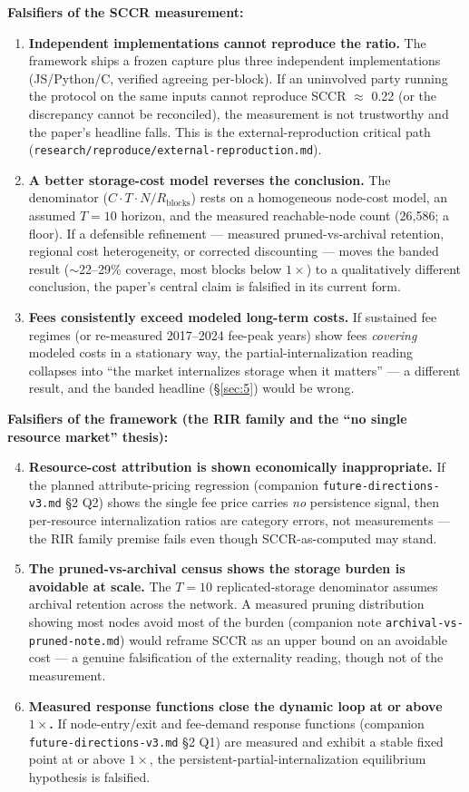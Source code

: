 \documentclass[11pt]{article}
\begin{document}
\textbf{Falsifiers of the SCCR measurement:}
\begin{enumerate}[nosep]
  \item \textbf{Independent implementations cannot reproduce the ratio.} The framework ships a frozen capture plus three independent implementations (JS/Python/C, verified agreeing per-block). If an uninvolved party running the protocol on the same inputs cannot reproduce SCCR $\approx$ 0.22 (or the discrepancy cannot be reconciled), the measurement is not trustworthy and the paper's headline falls. This is the external-reproduction critical path (\texttt{research/reproduce/external-reproduction.md}).
  \item \textbf{A better storage-cost model reverses the conclusion.} The denominator ($C \cdot T \cdot N / R_{\mathrm{blocks}}$) rests on a homogeneous node-cost model, an assumed $T=10$ horizon, and the measured reachable-node count (26{,}586; a floor). If a defensible refinement --- measured pruned-vs-archival retention, regional cost heterogeneity, or corrected discounting --- moves the banded result ($\sim$22--29\% coverage, most blocks below $1\times$) to a qualitatively different conclusion, the paper's central claim is falsified in its current form.
  \item \textbf{Fees consistently exceed modeled long-term costs.} If sustained fee regimes (or re-measured 2017--2024 fee-peak years) show fees \emph{covering} modeled costs in a stationary way, the partial-internalization reading collapses into ``the market internalizes storage when it matters'' --- a different result, and the banded headline (\S\ref{sec:5}) would be wrong.
\end{enumerate}

\textbf{Falsifiers of the framework (the RIR family and the ``no single resource market'' thesis):}
\begin{enumerate}[nosep]
  \setcounter{enumi}{3}
  \item \textbf{Resource-cost attribution is shown economically inappropriate.} If the planned attribute-pricing regression (companion \texttt{future-directions-v3.md} \S2 Q2) shows the single fee price carries \emph{no} persistence signal, then per-resource internalization ratios are category errors, not measurements --- the RIR family premise fails even though SCCR-as-computed may stand.
  \item \textbf{The pruned-vs-archival census shows the storage burden is avoidable at scale.} The $T=10$ replicated-storage denominator assumes archival retention across the network. A measured pruning distribution showing most nodes avoid most of the burden (companion note \texttt{archival-vs-pruned-note.md}) would reframe SCCR as an upper bound on an avoidable cost --- a genuine falsification of the externality reading, though not of the measurement.
  \item \textbf{Measured response functions close the dynamic loop at or above $1\times$.} If node-entry/exit and fee-demand response functions (companion \texttt{future-directions-v3.md} \S2 Q1) are measured and exhibit a stable fixed point at or above $1\times$, the persistent-partial-internalization equilibrium hypothesis is falsified.
\end{enumerate}
\end{document}
